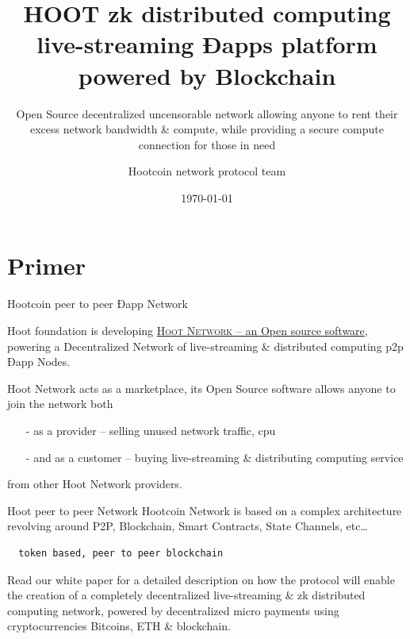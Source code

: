 \documentclass[10pt]{beamer}
\title{HOOT zk distributed computing live-streaming Ðapps platform powered by Blockchain}
\subtitle{Open Source decentralized uncensorable network allowing anyone to rent their excess network bandwidth \& compute, while providing a secure compute connection for those in need}
\date{\today}
\author{Hootcoin network protocol team}
\institute{Hootcoin Foundation}
\newcommand{\themename}{\textbf{\textsc{metropolis}}\xspace}
\begin{document}
\maketitle


\section{Primer}

\begin{frame}[fragile]{Hootcoin peer to peer Ðapp Network }

 Hoot foundation is developing \href{https://onhoot.com/tokensale}{\textsc{Hoot Network} – an Open source software}, powering a Decentralized Network of live-streaming \& distributed computing p2p Ðapp Nodes.
 

Hoot Network acts as a marketplace, its Open Source software allows anyone to join the network both 

\begin{itemize}
\item[-]as a provider – selling unused network traffic, cpu
\item[-]and as a customer – buying live-streaming \& distributing computing service
\end{itemize}
 from other Hoot Network providers. 
\end{frame}
\begin{frame}[fragile]{Hoot peer to peer Network }
 Hootcoin Network is based on a complex architecture revolving around P2P, Blockchain, Smart Contracts, State Channels, etc\ldots
 \begin{verbatim} 
  token based, peer to peer blockchain 
 \end{verbatim}
 
 Read our white paper for a detailed description on how the protocol will enable the creation of a completely decentralized live-streaming \& zk distributed computing network, powered by decentralized micro payments using cryptocurrencies Bitcoins, ETH \& blockchain. 


\end{frame}
\end{document}
